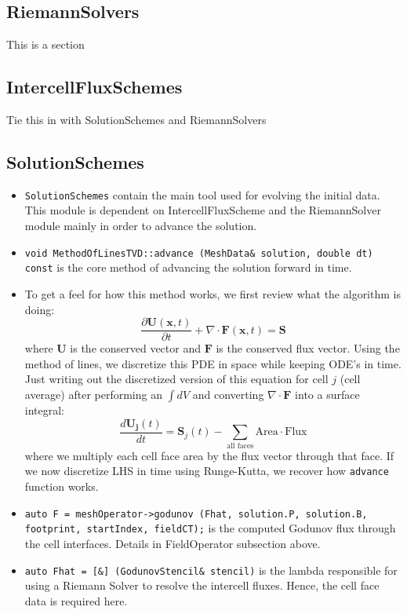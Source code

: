 \documentclass{article}
\begin{document}
\subsection{RiemannSolvers}
This is a section 

\subsection{IntercellFluxSchemes}
Tie this in with SolutionSchemes and RiemannSolvers

\subsection{SolutionSchemes}
\begin{itemize}
	\item \texttt{SolutionSchemes} contain the main tool used for evolving the initial data. This module is dependent on IntercellFluxScheme and the RiemannSolver module mainly in order to advance the solution. 
	\item \texttt{void MethodOfLinesTVD::advance (MeshData\& solution, double dt) const} is the core method of advancing the solution forward in time. 
	\item To get a feel for how this method works, we first review what the algorithm is doing: 
	$$\frac{\partial \mathbf{U}(\mathbf{x},t)}{\partial t} + \nabla \cdot  \mathbf{F}(\mathbf{x},t) = \mathbf{S}$$ where $\mathbf{U}$ is the conserved vector and $\mathbf{F}$ is the conserved flux vector. Using the method of lines, we discretize this PDE in space while keeping ODE's in time. Just writing out the discretized version of this equation for cell $j$ (cell average) after performing an $\int dV$ and converting $\nabla \cdot \mathbf{F}$ into a surface integral:
	\begin{equation}
	\frac{d \mathbf{U_j}(t)}{dt} = \mathbf{S}_{j}(t)- \sum_{\text{all faces}} \text{Area} \cdot \text{Flux}
	\end{equation}
where we multiply each cell face area by the flux vector through that face. If we now discretize LHS in time using Runge-Kutta, we recover how \texttt{advance} function works.
	\item \texttt{auto F = meshOperator->godunov (Fhat, solution.P, solution.B, footprint, startIndex, fieldCT);} is the computed Godunov flux through the cell interfaces. Details in FieldOperator subsection above.
	\item \texttt{auto Fhat = [\&] (GodunovStencil\& stencil)} is the lambda responsible for using a Riemann Solver to resolve the intercell fluxes. Hence, the cell face data is required here.

\end{itemize}
\end{document}
